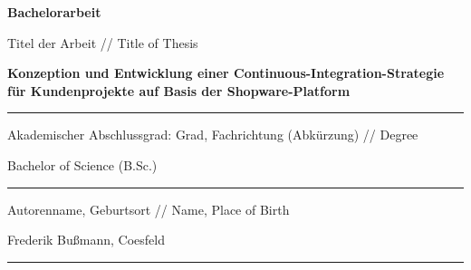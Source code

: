 
\begin{titlepage}
        \hspace{2.16cm}
        \vspace{1.6cm}

        \begingroup
        \fontsize{44pt}{46pt}\selectfont
        {\bfseries Bachelorarbeit}
        \endgroup

        \vskip 1.44cm

        \begingroup
        \fontsize{8pt}{6pt}\selectfont
        Titel der Arbeit // Title of Thesis
        \endgroup

        \vskip -0.1cm

        \begingroup
        \fontsize{12pt}{18pt}\selectfont
        {\bfseries Konzeption und Entwicklung einer Continuous-Integration-Strategie für Kundenprojekte auf Basis der
        Shopware-Platform\par}
        \endgroup
        \vskip -0.03cm

        \noindent\rule{14.4cm}{0.4pt}

        \vskip 0.1cm

        \begingroup
        \fontsize{8pt}{6pt}\selectfont
        Akademischer Abschlussgrad: Grad, Fachrichtung (Abkürzung) // Degree
        \endgroup

        \vskip 0.03cm

        \begingroup
        \fontsize{12pt}{14pt}\selectfont
        Bachelor of Science (B.Sc.)
        \endgroup

        \vskip -0.05cm

        \noindent\rule{14.4cm}{0.4pt}

        \vskip 0.13cm

        \begingroup
        \fontsize{8pt}{6pt}\selectfont
        Autorenname, Geburtsort // Name, Place of Birth
        \endgroup

        \vskip 0.03cm

        \begingroup
        \fontsize{12pt}{14pt}\selectfont
        Frederik Bußmann, Coesfeld
        \endgroup

        \vskip -0.05cm

        \noindent\rule{14.4cm}{0.4pt}


\end{titlepage}
